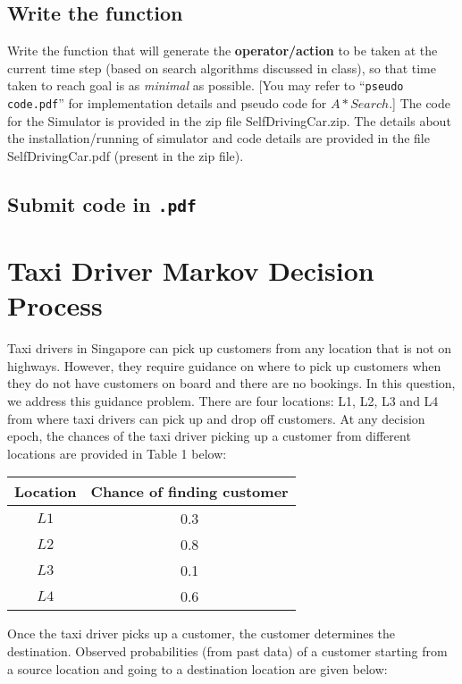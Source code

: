 \documentclass[12pt, letterpaper]{article}
\begin{document}
\subsection{Write the function}
Write the function that will generate the \textbf{operator/action} to be taken at the current time step (based on search algorithms discussed in class), so that time taken to reach goal is as \textit{minimal} as possible. [You may refer to “\texttt{pseudo code.pdf}” for implementation details and pseudo code for $A* Search$.]
The code for the Simulator is provided in the zip file SelfDrivingCar.zip. The details about the
installation/running of simulator and code details are provided in the file SelfDrivingCar.pdf
(present in the zip file).

\subsection{Submit code in \texttt{.pdf}}

\section{Taxi Driver Markov Decision Process}
Taxi drivers in Singapore can pick up customers from any location that is not on highways. However, they require guidance on where to pick up customers when they do not have customers on board and there are no bookings. In this question, we address this guidance
problem. There are four locations: L1, L2, L3 and L4 from where taxi drivers can pick up and drop off
customers. At any decision epoch, the chances of the taxi driver picking up a customer from
different locations are provided in Table 1 below:

\begin{center}
    \begin{tabular}{|c|c|} 
    \hline
    Location & Chance of finding customer\\ 
    \hline
    $L1$ & 0.3 \\
    \hline
    $L2$ & 0.8 \\
    \hline
    $L3$ & 0.1 \\
    \hline
    $L4$ & 0.6 \\
    \hline
    \end{tabular}
    
\end{center}

Once the taxi driver picks up a customer, the customer determines the destination. Observed
probabilities (from past data) of a customer starting from a source location and going to a
destination location are given below:
\end{document}
